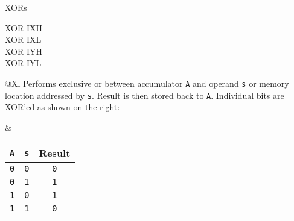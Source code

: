 \begin{basedescript}{
	\desclabelstyle{\multilinelabel}
	\desclabelwidth{3cm}}
\begin{DetailItem}{XOR}{s}
\begin{DetailVariants}
			\columnbreak
			XOR IXH\UNDOC\\
			XOR IXL\UNDOC\\
			XOR IYH\UNDOC\\
			XOR IYL\UNDOC
		\end{DetailVariants}
		
		\begin{tabularx}{\linewidth}{@{}Xl}
			Performs exclusive or between accumulator {\tt A} and operand {\tt s} or memory location addressed by {\tt s}. Result is then stored back to {\tt A}. Individual bits are XOR'ed as shown on the right:
	
			&

			\begin{tabular}[t]{cc|c}
				{\tt A} & {\tt s} & Result \\
				\hline
				{\tt 0} & {\tt 0} & {\tt 0} \\
				{\tt 0} & {\tt 1} & {\tt 1} \\
				{\tt 1} & {\tt 0} & {\tt 1} \\
				{\tt 1} & {\tt 1} & {\tt 0} \\
			\end{tabular}

			\\
		\end{tabularx}

		\begin{DetailEffects}[p]
			\FlagsXORr
		\end{DetailEffects}

		\begin{DetailEffectsFlags}
			\DetailFlagSF{\DetailFlagResultSign}
			\DetailFlagZF{\DetailFlagResultZero}
			\DetailFlagPV{\DetailFlagResultParity}
		\end{DetailEffectsFlags}

		\begin{DetailTiming}
		\end{DetailTiming}

	\end{DetailItem}

\end{basedescript}
